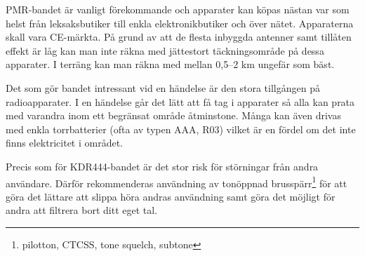 PMR-bandet är vanligt förekommande och apparater kan köpas nästan var som helst från leksaksbutiker till enkla elektronikbutiker och över nätet. Apparaterna skall vara CE-märkta. På grund av att de flesta inbyggda antenner samt tillåten effekt är låg kan man inte räkna med jättestort täckningsområde på dessa apparater. I terräng kan man räkna med mellan 0,5--2 km ungefär som bäst. 

Det som gör bandet intressant vid en händelse är den stora tillgången på radioapparater. I en händelse går det lätt att få tag i apparater så alla kan prata med varandra inom ett begränsat område åtminstone. Många kan även drivas med enkla torrbatterier (ofta av typen AAA, R03) vilket är en fördel om det inte finns elektricitet i området.

Precis som för KDR444-bandet är det stor risk för störningar från andra användare. Därför rekommenderas användning av tonöppnad brusspärr\footnote{pilotton, CTCSS, tone squelch, subtone} för att göra det lättare att slippa höra andras användning samt göra det möjligt för andra att filtrera bort ditt eget tal.

